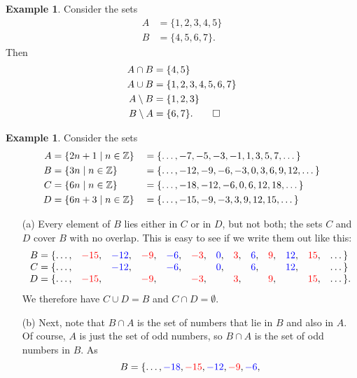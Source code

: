 \documentclass[a4paper]{book}
\theoremstyle{definition}
\newtheorem{example}[theorem]{Example}
\begin{document}
\begin{example}
 Consider the sets
 \begin{align*}
  A &= \{ 1,2,3,4,5 \} \\
  B &= \{ 4,5,6,7 \}.
 \end{align*}
 Then
 \begin{align*}
  A\cap B &= \{4,5\} \\
  A\cup B &= \{1,2,3,4,5,6,7\} \\
  A\setminus  B &= \{1,2,3\} \\
  B\setminus  A &= \{6,7\}. \qed
 \end{align*}
\end{example}
\begin{example}
 Consider the sets
 \begin{align*}
  A &= \{ 2n+1\;|\; n\in{\mathbb{Z}} \} 
    &&= \{ \dotsc,-7,-5,-3,-1,1,3,5,7,\dotsc\} \\
  B &= \{3n\;|\; n\in{\mathbb{Z}}\} 
    &&= \{ \dotsc,-12,-9,-6,-3,0,3,6,9,12,\dotsc\} \\
  C &= \{6n\;|\; n\in{\mathbb{Z}}\} 
    &&= \{ \dotsc,-18,-12,-6,0,6,12,18,\dotsc\} \\
  D &= \{6n+3\;|\; n\in{\mathbb{Z}}\} 
    &&= \{ \dotsc,-15,-9,-3,3,9,12,15,\dotsc\}
 \end{align*}
 \begin{itemize}
  \item[(a)] Every element of $B$ lies either in $C$ or in $D$, but
   not both; the sets $C$ and $D$ cover $B$ with no overlap.  This is
   easy to see if we write them out like this:
   {\small \[ \begin{array}{rcccccccccccl}
       B=\{ \dotsc,& {\color{red}-15}, & {\color{blue}-12}, & {\color{red}-9}, & {\color{blue}-6},
                   & {\color{red}-3},  & {\color{blue}0},   & {\color{red}3},  & {\color{blue}6},
                   & {\color{red}9},   & {\color{blue}12},  & {\color{red}15}, & \dotsc\} \\
       C=\{ \dotsc,&& {\color{blue}-12}, && {\color{blue}-6}, && {\color{blue}0}, && {\color{blue}6},
                   && {\color{blue}12},&& \dotsc\} \\
       D=\{ \dotsc,& {\color{red}-15}, && {\color{red}-9}, && {\color{red}-3}, && {\color{red}3},
                   && {\color{red}9}, && {\color{red}15}, & \dotsc\}.
   \end{array} \]}
   We therefore have $C\cup D=B$ and $C\cap D=\emptyset$.
  \item[(b)] Next, note that $B\cap A$ is the set of numbers that lie
   in $B$ and also in $A$.  Of course, $A$ is just the set of odd
   numbers, so $B\cap A$ is the set of odd numbers in $B$.  As
   \[ B = \{\dotsc,{\color{blue}-18},{\color{red}-15},{\color{blue}-12},{\color{red}-9},{\color{blue}-6},
\]
\end{itemize}
\end{example}
\end{document}
